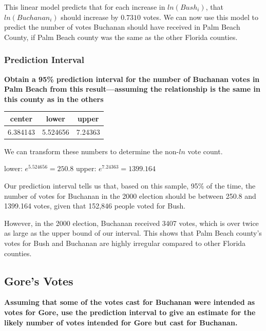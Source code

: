 \documentclass[
  letterpaper,
  DIV=11,
  numbers=noendperiod]{scrartcl}
\begin{document}
This linear model predicts that for each increase in \(ln(Bush_i)\),
that \(ln(Buchanan_i)\) should increase by \(0.7310\) votes. We can now
use this model to predict the number of votes Buchanan should have
received in Palm Beach County, if Palm Beach county was the same as the
other Florida counties.

\hypertarget{prediction-interval}{%
\subsubsection{Prediction Interval}\label{prediction-interval}}

\textbf{Obtain a 95\% prediction interval for the number of Buchanan
votes in Palm Beach from this result---assuming the relationship is the
same in this county as in the others}

\begin{table}[H]
\centering
\begin{tabular}[t]{ccc}
\toprule
center & lower & upper\\
\midrule
6.384143 & 5.524656 & 7.24363\\
\bottomrule
\end{tabular}
\end{table}

We can transform these numbers to determine the non-\(ln\) vote count.

lower: \(e^{5.524656} = 250.8\) upper: \(e^{7.24363} = 1399.164\)

Our prediction interval tells us that, based on this sample, 95\% of the
time, the number of votes for Buchanan in the 2000 election should be
between 250.8 and 1399.164 votes, given that 152,846 people voted for
Bush.

However, in the 2000 election, Buchanan received 3407 votes, which is
over twice as large as the upper bound of our interval. This shows that
Palm Beach county's votes for Bush and Buchanan are highly irregular
compared to other Florida counties.

\hypertarget{gores-votes}{%
\subsection{Gore's Votes}\label{gores-votes}}

\textbf{Assuming that some of the votes cast for Buchanan were intended
as votes for Gore, use the prediction interval to give an estimate for
the likely number of votes intended for Gore but cast for Buchanan.}
\end{document}
